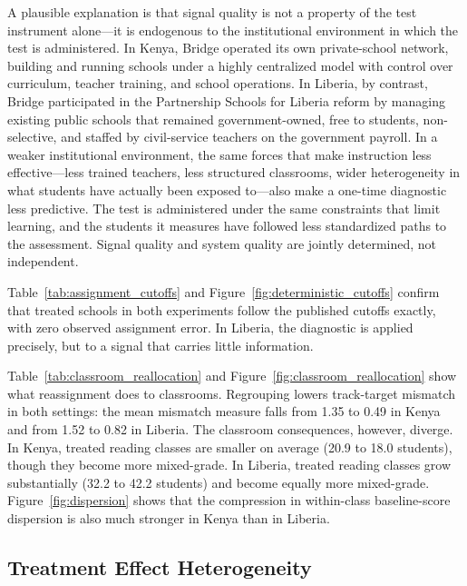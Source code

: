 \documentclass[11pt]{article}
\begin{document}
A plausible explanation is that signal quality is not a property of the test instrument alone---it is endogenous to the institutional environment in which the test is administered. In Kenya, Bridge operated its own private-school network, building and running schools under a highly centralized model with control over curriculum, teacher training, and school operations. In Liberia, by contrast, Bridge participated in the Partnership Schools for Liberia reform by managing existing public schools that remained government-owned, free to students, non-selective, and staffed by civil-service teachers on the government payroll. In a weaker institutional environment, the same forces that make instruction less effective---less trained teachers, less structured classrooms, wider heterogeneity in what students have actually been exposed to---also make a one-time diagnostic less predictive. The test is administered under the same constraints that limit learning, and the students it measures have followed less standardized paths to the assessment. Signal quality and system quality are jointly determined, not independent.

Table~\ref{tab:assignment_cutoffs} and Figure~\ref{fig:deterministic_cutoffs} confirm that treated schools in both experiments follow the published cutoffs exactly, with zero observed assignment error. In Liberia, the diagnostic is applied precisely, but to a signal that carries little information.

Table~\ref{tab:classroom_reallocation} and Figure~\ref{fig:classroom_reallocation} show what reassignment does to classrooms. Regrouping lowers track-target mismatch in both settings: the mean mismatch measure falls from 1.35 to 0.49 in Kenya and from 1.52 to 0.82 in Liberia. The classroom consequences, however, diverge. In Kenya, treated reading classes are smaller on average (20.9 to 18.0 students), though they become more mixed-grade. In Liberia, treated reading classes grow substantially (32.2 to 42.2 students) and become equally more mixed-grade. Figure~\ref{fig:dispersion} shows that the compression in within-class baseline-score dispersion is also much stronger in Kenya than in Liberia.

\subsection{Treatment Effect Heterogeneity}
\end{document}
